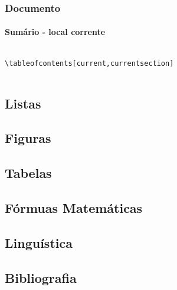 \begin{frame}[fragile]
\frametitle{Documento}
\framesubtitle{Sumário - local corrente}
  \scriptsize
  \begin{columns}[c]
  \begin{verbatim}
\tableofcontents[current,currentsection]
  \end{verbatim} 
  \begin{fmpage}{\textwidth}
  \scriptsize
  \end{fmpage}
  \end{columns}
\end{frame}


\subsection{Listas}


\subsection{Figuras}


\subsection{Tabelas}


\subsection{Fórmuas Matemáticas}


\subsection{Linguística}


\subsection{Bibliografia}

